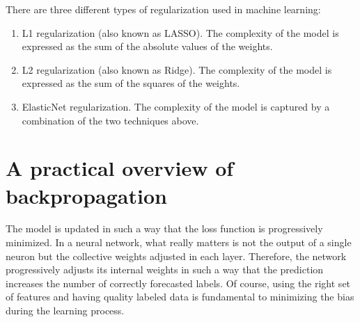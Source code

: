 There are three different types of regularization used in machine learning:
\begin{enumerate}
    \item L1 regularization (also known as LASSO). The complexity of the model is expressed as the sum
          of the absolute values of the weights.
    \item L2 regularization (also known as Ridge). The complexity of the model is expressed as the sum
          of the squares of the weights.
    \item ElasticNet regularization. The complexity of the model is captured by a combination of the
          two techniques above.
\end{enumerate}
\section{A practical overview of backpropagation}
The model is updated in such a way that the loss function is progressively minimized. In a neural network, what really matters is not the output of a single neuron but the collective weights adjusted in each layer. Therefore, the network progressively adjusts its internal weights in such a way that the prediction increases the number of correctly forecasted labels. Of course, using the right set of features and having quality labeled data is fundamental to minimizing the bias during the learning process.
